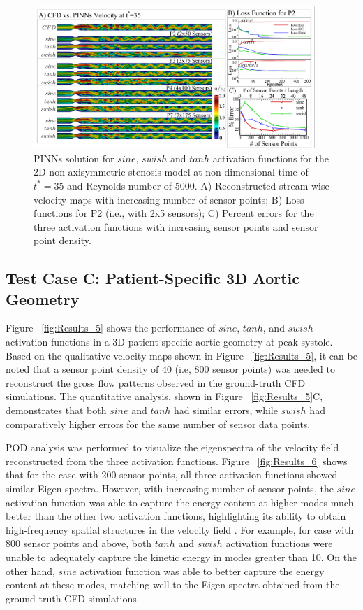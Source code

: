 \documentclass[times,twocolumn,final]{elsarticle}
\begin{document}
{%
\begin{figure}[!t]
\centering
\includegraphics[width=0.95\textwidth]{./Figures/Figure4_StenosisResults_v2}
\caption{PINNs solution for $sine$, $swish$ and $tanh$ activation functions for the 2D non-axisymmetric stenosis model at non-dimensional time of $t^{*}=35$ and Reynolds number of 5000. A) Reconstructed stream-wise velocity maps with increasing number of sensor points; B) Loss functions for P2 (i.e., with 2x5 sensors); C) Percent errors for the three activation functions with increasing sensor points and sensor point density.}
\label{fig:Results_2}
\end{figure}


\subsection{Test Case C: Patient-Specific 3D Aortic Geometry}
Figure ~\ref{fig:Results_5} shows the performance of $sine$, $tanh$, and $swish$ activation functions in a 3D patient-specific aortic geometry at peak systole. Based on the qualitative velocity maps shown in Figure ~\ref{fig:Results_5}, it can be noted that a sensor point density of 40 (i.e, 800 sensor points) was needed to reconstruct the gross flow patterns observed in the ground-truth CFD simulations. The quantitative analysis, shown in Figure ~\ref{fig:Results_5}C, demonstrates that both $sine$ and $tanh$ had similar errors, while $swish$ had comparatively higher errors for the same number of sensor data points.

POD analysis was performed to visualize the eigenspectra of the velocity field reconstructed from the three activation functions. Figure ~\ref{fig:Results_6} shows that for the case with 200 sensor points, all three activation functions showed similar Eigen spectra. However, with increasing number of sensor points, the $sine$ activation function was able to capture the energy content at higher modes much better than the other two activation functions, highlighting its ability to obtain high-frequency spatial structures in the velocity field . For example, for case with 800 sensor points and above, both $tanh$ and $swish$ activation functions were unable to adequately capture the kinetic energy in modes greater than 10. On the other hand, $sine$ activation function was able to better capture the energy content at these modes, matching well to the Eigen spectra obtained from the ground-truth CFD simulations. 

}
\end{document}
